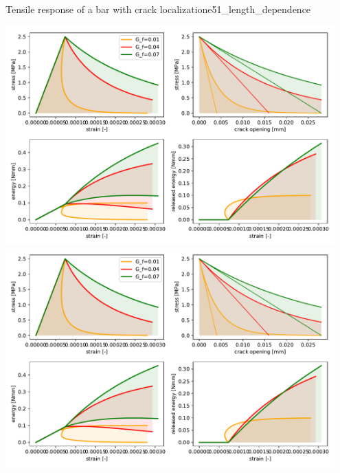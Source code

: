 \documentclass[main.tex]{subfiles}
\begin{document}
\begin{bmcsex}{Tensile response of a bar with crack localization}{e51_length_dependence}
\begin{center}
\begin{center}
        \includegraphics[width=0.95\textwidth]{examples/e51_length_dependence/fig_fracture_energy_dependence.pdf}\\
        \includegraphics[width=0.95\textwidth]{examples/e51_length_dependence/fig_fracture_energy_dependence.pdf}\\
    \end{center}
\end{center}
            \end{bmcsex}
\end{document}
